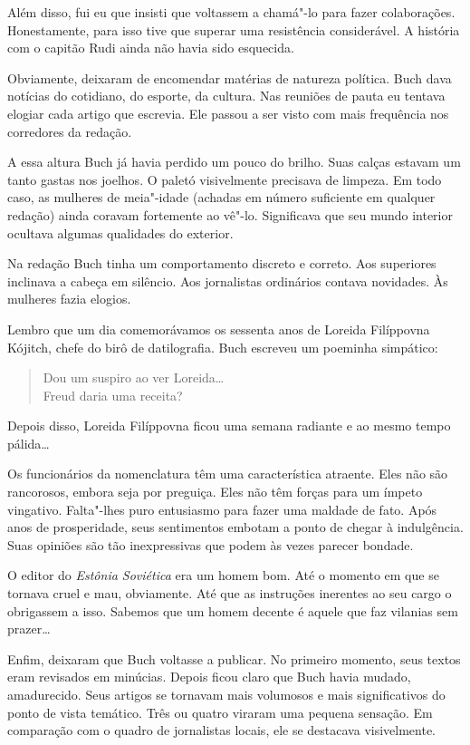 Além disso, fui eu que insisti que voltassem a chamá"-lo para fazer
colaborações. Honestamente, para isso tive que superar uma resistência
considerável. A história com o capitão Rudi ainda não havia sido
esquecida.

Obviamente, deixaram de encomendar matérias de natureza política. Buch
dava notícias do cotidiano, do esporte, da cultura. Nas reuniões de
pauta eu tentava elogiar cada artigo que escrevia. Ele passou a ser
visto com mais frequência nos corredores da redação.

A essa altura Buch já havia perdido um pouco do brilho. Suas calças
estavam um tanto gastas nos joelhos. O paletó visivelmente precisava de
limpeza. Em todo caso, as mulheres de meia"-idade (achadas em número
suficiente em qualquer redação) ainda coravam fortemente ao vê"-lo.
Significava que seu mundo interior ocultava algumas qualidades do
exterior.

Na redação Buch tinha um comportamento discreto e correto. Aos
superiores inclinava a cabeça em silêncio. Aos jornalistas ordinários
contava novidades. Às mulheres fazia elogios.

Lembro que um dia comemorávamos os sessenta anos de Loreida Filíppovna
Kójitch, chefe do birô de datilografia. Buch escreveu um poeminha
simpático:

\begin{verse}
Dou um suspiro ao ver Loreida\ldots{}\\
Freud daria uma receita?
\end{verse}

Depois disso, Loreida Filíppovna ficou uma semana radiante e ao mesmo
tempo pálida\ldots{}

Os funcionários da nomenclatura têm uma característica atraente. Eles
não são rancorosos, embora seja por preguiça. Eles não têm forças para
um ímpeto vingativo. Falta"-lhes puro entusiasmo para fazer uma maldade
de fato. Após anos de prosperidade, seus sentimentos embotam a ponto de
chegar à indulgência. Suas opiniões são tão inexpressivas que podem às
vezes parecer bondade.

O editor do \emph{Estônia Soviética} era um homem bom. Até o momento em
que se tornava cruel e mau, obviamente. Até que as instruções inerentes
ao seu cargo o obrigassem a isso. Sabemos que um homem decente é aquele
que faz vilanias sem prazer\ldots{}

Enfim, deixaram que Buch voltasse a publicar. No primeiro momento, seus
textos eram revisados em minúcias. Depois ficou claro que Buch havia
mudado, amadurecido. Seus artigos se tornavam mais volumosos e mais
significativos do ponto de vista temático. Três ou quatro viraram uma
pequena sensação. Em comparação com o quadro de jornalistas locais, ele
se destacava visivelmente.

